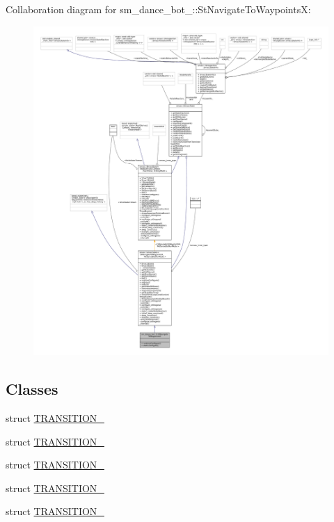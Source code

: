 Collaboration diagram for sm\+\_\+dance\+\_\+bot\+\_\+:\+:St\+Navigate\+To\+WaypointsX\+:
\nopagebreak
\begin{figure}[H]
\begin{center}
\leavevmode
\includegraphics[width=350pt]{structsm__dance__bot__2_1_1StNavigateToWaypointsX__coll__graph}
\end{center}
\end{figure}
\subsection*{Classes}
\begin{DoxyCompactItemize}
\item 
struct \hyperlink{structsm__dance__bot__2_1_1StNavigateToWaypointsX_1_1TRANSITION__1}{T\+R\+A\+N\+S\+I\+T\+I\+O\+N\+\_}
\item 
struct \hyperlink{structsm__dance__bot__2_1_1StNavigateToWaypointsX_1_1TRANSITION__2}{T\+R\+A\+N\+S\+I\+T\+I\+O\+N\+\_}
\item 
struct \hyperlink{structsm__dance__bot__2_1_1StNavigateToWaypointsX_1_1TRANSITION__3}{T\+R\+A\+N\+S\+I\+T\+I\+O\+N\+\_}
\item 
struct \hyperlink{structsm__dance__bot__2_1_1StNavigateToWaypointsX_1_1TRANSITION__4}{T\+R\+A\+N\+S\+I\+T\+I\+O\+N\+\_}
\item 
struct \hyperlink{structsm__dance__bot__2_1_1StNavigateToWaypointsX_1_1TRANSITION__5}{T\+R\+A\+N\+S\+I\+T\+I\+O\+N\+\_}
\end{DoxyCompactItemize}
